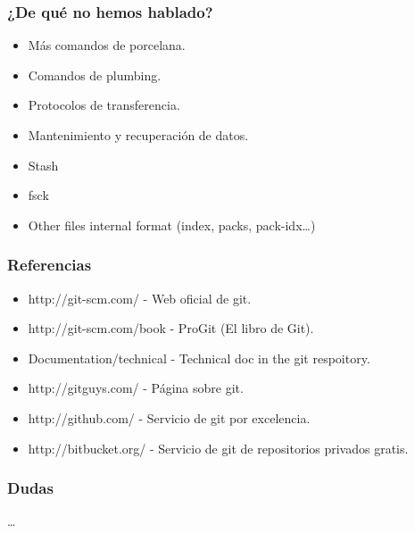 \documentclass[10pt]{beamer}
\begin{document}
  \begin{frame}[containsverbatim]
    \frametitle{¿De qué no hemos hablado?}
    \begin{itemize}
        \item Más comandos de porcelana.
        \item Comandos de plumbing.
        \item Protocolos de transferencia.
        \item Mantenimiento y recuperación de datos.
        \item Stash
        \item fsck
        \item Other files internal format (index, packs, pack-idx\dots{})
    \end{itemize}
  \end{frame}

  \begin{frame}[containsverbatim]
    \frametitle{Referencias}
    \begin{itemize}
      \item \small{http://git-scm.com/ - Web oficial de git.}
      \item \small{http://git-scm.com/book - ProGit (El libro de Git).}
      \item \small{Documentation/technical - Technical doc in the git respoitory. }
      \item \small{http://gitguys.com/ - Página sobre git.}
      \item \small{http://github.com/ - Servicio de git por excelencia.}
      \item \small{http://bitbucket.org/ - Servicio de git de repositorios privados gratis.}
    \end{itemize}
  \end{frame}

  \begin{frame}[containsverbatim]
    \frametitle{Dudas}
    \dots
  \end{frame}
\end{document}
